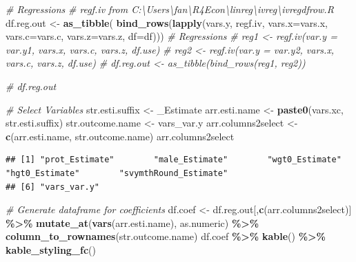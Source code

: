 \documentclass[
]{book}
\newenvironment{Shaded}{\begin{snugshade}}{\end{snugshade}}
\newcommand{\CommentTok}[1]{\textcolor[rgb]{0.56,0.35,0.01}{\textit{#1}}}
\newcommand{\DataTypeTok}[1]{\textcolor[rgb]{0.13,0.29,0.53}{#1}}
\newcommand{\KeywordTok}[1]{\textcolor[rgb]{0.13,0.29,0.53}{\textbf{#1}}}
\newcommand{\NormalTok}[1]{#1}
\newcommand{\OperatorTok}[1]{\textcolor[rgb]{0.81,0.36,0.00}{\textbf{#1}}}
\newcommand{\StringTok}[1]{\textcolor[rgb]{0.31,0.60,0.02}{#1}}
\begin{document}
\begin{Shaded}
\begin{Highlighting}[]
\CommentTok{\# Regressions}
\CommentTok{\# regf.iv from C:\textbackslash{}Users\textbackslash{}fan\textbackslash{}R4Econ\textbackslash{}linreg\textbackslash{}ivreg\textbackslash{}ivregdfrow.R}
\NormalTok{df.reg.out \textless{}{-}}\StringTok{ }\KeywordTok{as\_tibble}\NormalTok{(}
  \KeywordTok{bind\_rows}\NormalTok{(}\KeywordTok{lapply}\NormalTok{(vars.y, regf.iv,}
                   \DataTypeTok{vars.x=}\NormalTok{vars.x, }\DataTypeTok{vars.c=}\NormalTok{vars.c, }\DataTypeTok{vars.z=}\NormalTok{vars.z, }\DataTypeTok{df=}\NormalTok{df)))}
\CommentTok{\# Regressions}
\CommentTok{\# reg1 \textless{}{-} regf.iv(var.y = var.y1, vars.x, vars.c, vars.z, df.use)}
\CommentTok{\# reg2 \textless{}{-} regf.iv(var.y = var.y2, vars.x, vars.c, vars.z, df.use)}
\CommentTok{\# df.reg.out \textless{}{-} as\_tibble(bind\_rows(reg1, reg2))}
\end{Highlighting}
\end{Shaded}

\begin{Shaded}
\begin{Highlighting}[]
\CommentTok{\# df.reg.out}
\end{Highlighting}
\end{Shaded}

\begin{Shaded}
\begin{Highlighting}[]
\CommentTok{\# Select Variables}
\NormalTok{str.esti.suffix \textless{}{-}}\StringTok{ \textquotesingle{}\_Estimate\textquotesingle{}}
\NormalTok{arr.esti.name \textless{}{-}}\StringTok{ }\KeywordTok{paste0}\NormalTok{(vars.xc, str.esti.suffix)}
\NormalTok{str.outcome.name \textless{}{-}}\StringTok{ \textquotesingle{}vars\_var.y\textquotesingle{}}
\NormalTok{arr.columns2select \textless{}{-}}\StringTok{ }\KeywordTok{c}\NormalTok{(arr.esti.name, str.outcome.name)}
\NormalTok{arr.columns2select}
\end{Highlighting}
\end{Shaded}

\begin{verbatim}
## [1] "prot_Estimate"        "male_Estimate"        "wgt0_Estimate"        "hgt0_Estimate"        "svymthRound_Estimate"
## [6] "vars_var.y"
\end{verbatim}

\begin{Shaded}
\begin{Highlighting}[]
\CommentTok{\# Generate dataframe for coefficients}
\NormalTok{df.coef \textless{}{-}}\StringTok{ }\NormalTok{df.reg.out[,}\KeywordTok{c}\NormalTok{(arr.columns2select)] }\OperatorTok{\%\textgreater{}\%}
\StringTok{  }\KeywordTok{mutate\_at}\NormalTok{(}\KeywordTok{vars}\NormalTok{(arr.esti.name), as.numeric) }\OperatorTok{\%\textgreater{}\%}\StringTok{ }\KeywordTok{column\_to\_rownames}\NormalTok{(str.outcome.name)}
\NormalTok{df.coef }\OperatorTok{\%\textgreater{}\%}
\StringTok{  }\KeywordTok{kable}\NormalTok{() }\OperatorTok{\%\textgreater{}\%}
\StringTok{  }\KeywordTok{kable\_styling\_fc}\NormalTok{()}
\end{Highlighting}
\end{Shaded}
\end{document}
